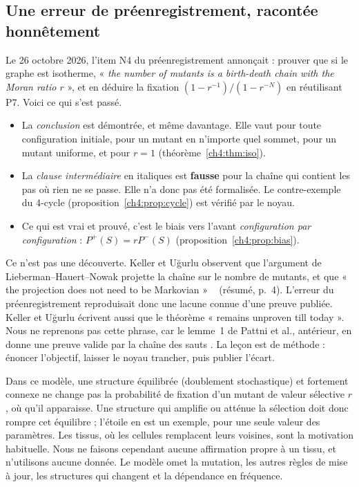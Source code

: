 \subsection{Une erreur de préenregistrement, racontée honnêtement}
\begin{warnbox}
\tierC{} Le 26 octobre 2026, l'item N4 du préenregistrement annonçait : prouver que si le graphe est isotherme,
« \emph{the number of mutants is a birth-death chain with the Moran ratio $r$} », et en déduire la fixation
$(1-r^{-1})/(1-r^{-N})$ en réutilisant P7. Voici ce qui s'est passé.
\begin{itemize}[itemsep=1pt]
\item La \emph{conclusion} est démontrée, et même davantage. Elle vaut pour toute configuration initiale, pour un
mutant en n'importe quel sommet, pour un mutant uniforme, et pour $r=1$ (théorème~\ref{ch4:thm:iso}).
\item La \emph{clause intermédiaire} en italiques est \textbf{fausse} pour la chaîne qui contient les pas où rien
ne se passe. Elle n'a donc pas été formalisée. Le contre-exemple du 4-cycle (proposition~\ref{ch4:prop:cycle}) est
vérifié par le noyau.
\item Ce qui est vrai et prouvé, c'est le biais vers l'avant \emph{configuration par configuration} :
$P^{+}(S)=rP^{-}(S)$ (proposition~\ref{ch4:prop:bias}).
\end{itemize}
Ce n'est pas une découverte. Keller et Uğurlu observent que l'argument de Lieberman--Hauert--Nowak projette la
chaîne sur le nombre de mutants, et que « the projection does not need to be Markovian » \tierL{}~\cite{ch4:KU}
(résumé, p.~4). L'erreur du préenregistrement reproduisait donc une lacune connue d'une preuve publiée. Keller et
Uğurlu écrivent aussi que le théorème « remains unproven till today ». Nous ne reprenons pas cette phrase, car le
lemme~1 de Pattni et al., antérieur, en donne une preuve valide par la chaîne des sauts \tierC. La leçon est de
méthode : énoncer l'objectif, laisser le noyau trancher, puis publier l'écart.
\end{warnbox}

\begin{physbox}
\tierC{} Dans ce modèle, une structure équilibrée (doublement stochastique) et fortement connexe ne change pas la
probabilité de fixation d'un mutant de valeur sélective $r$, où qu'il apparaisse. Une structure qui amplifie ou
atténue la sélection doit donc rompre cet équilibre ; l'étoile en est un exemple, pour une seule valeur des
paramètres. Les tissus, où les cellules remplacent leurs voisines, sont la motivation habituelle. Nous ne faisons
cependant aucune affirmation propre à un tissu, et n'utilisons aucune donnée. Le modèle omet la mutation, les
autres règles de mise à jour, les structures qui changent et la dépendance en fréquence.
\end{physbox}

